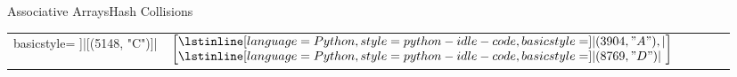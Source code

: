 \begin{frame}{Associative Arrays}{Hash Collisions}
\begin{table}[!b]
\begin{tabularx}{\textwidth}{l|ccccc}
        basicstyle=\small
      ]|[(5148, "C")]| &
      \begin{math}
        \left[\begin{array}{@{}l@{}}
          \lstinline[
            language=Python,
            style={python-idle-code},
            basicstyle=\small
          ]|(3904, "A"),|\\
          \lstinline[
            language=Python,
            style={python-idle-code},
            basicstyle=\small
          ]|(8769, "D")|
        \end{array}\right]
      \end{math}
    \end{tabularx}
  \end{table}
\end{frame}


